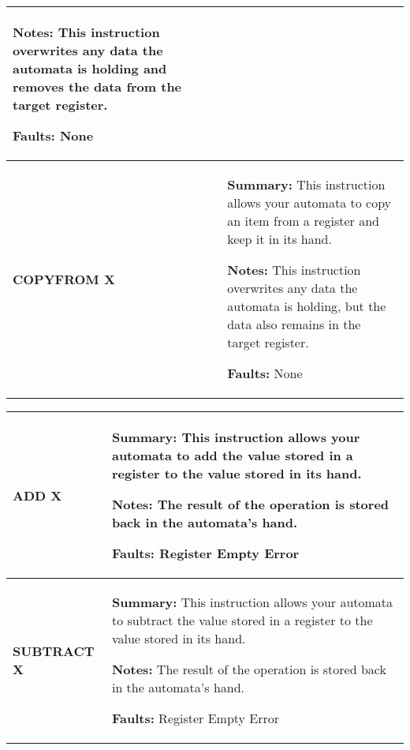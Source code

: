 \begin{center}
\begin{tabular}{ | m{3cm} | m{11cm} | }
    
            \textbf{Notes:} 
            \newline This instruction overwrites any data the automata is holding and removes the data from the target register.
    
            \textbf{Faults:}
            \newline None\\
        \hline
            \begin{center}
                \textbf{COPYFROM X} 
            \end{center}& 
            \textbf{Summary:} 
            \newline This instruction allows your automata to copy an item from a register and keep it in its hand.
    
            \textbf{Notes:} 
            \newline This instruction overwrites any data the automata is holding, but the data also remains in the target register.
    
            \textbf{Faults:}
            \newline None\\
        \hline
    \end{tabular}

    \begin{tabular}{ | m{3cm} | m{11cm} | } 
        \hline
            \begin{center}
                \textbf{ADD X} 
            \end{center}& 
            \textbf{Summary:} 
            \newline This instruction allows your automata to add the value stored in a register to the value stored in its hand.
    
            \textbf{Notes:} 
            \newline The result of the operation is stored back in the automata’s hand.
    
            \textbf{Faults:}
            \newline Register Empty Error\\
        \hline
            \begin{center}
                \textbf{SUBTRACT X} 
            \end{center}& 
            \textbf{Summary:} 
            \newline This instruction allows your automata to subtract the value stored in a register to the value stored in its hand.

            \textbf{Notes:} 
            \newline The result of the operation is stored back in the automata’s hand.

            \textbf{Faults:}
            \newline Register Empty Error\\
        \hline
    \end{tabular}
\end{center}
\newpage